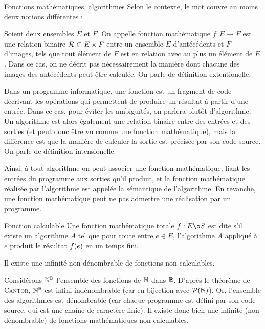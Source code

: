 \documentclass[a4paper,french,bookmarks]{book}
\begin{document}
    \begin{definition}{Fonctions mathématiques, algorithmes}{}
        Selon le contexte, le mot  couvre au moins deux notions différentes :
        \begin{enumerate}
            \itt Soient deux ensembles $E$ et $F$. On appelle fonction mathématique $f: E \to F$  est une relation binaire $\mathcal{R} \subset E\times F$ entre un ensemble $E$ d'antécédents et $F$ d'images, tels que tout élément de $F$ est en relation avec au plus un élément de $E$. Dans ce cas, on ne décrit pas nécessairement la manière dont chacune des images des antécédents peut être calculée. On parle de définition extentionelle.
            
            \itt Dans un programme informatique, une fonction est un fragment de code décrivant les opérations qui permettent de produire un résultat à partir d'une entrée. Dans ce cas, pour éviter les ambiguïtés, on parlera plutôt d'algorithme. Un algorithme est alors également une relation binaire entre des entrées et des sorties (et peut donc être vu comme une fonction mathématique), mais la différence est que la manière de calculer la sortie est précisée par son code source. On parle de définition intensionelle.
        \end{enumerate}
    \end{definition}
    
    Ainsi, à tout algorithme on peut associer une fonction mathématique, liant les entrées du programme aux sorties qu'il produit, et la fonction mathématique réalisée par l'algorithme est appelée la sémantique de l'algorithme. En revanche, une fonction mathématique peut ne pas admettre une réalisation par un programme.
    
    \begin{definition}{Fonction calculable}{}
        Une fonction mathématique totale $f: E \o S$ est dite  s'il existe un algorithme $A$ tel que pour toute entre $e \in E$, l'algorithme $A$ appliqué à $e$ produit le résultat $f\!\left(e\right)$ en un temps fini.
    \end{definition}
    
    \begin{theorem}{}{}
        Il existe une infinité non dénombrable de fonctions non calculables.
    \end{theorem}
    
    \begin{nproof}
        Considérons $\mathbb{N}^{\mathbb{B}}$ l'ensemble des fonctions de $\mathbb{N}$ dans $\mathbb{B}$. D'après le théorème de \textsc{Cantor}, $\mathbb{N}^{\mathbb{B}}$ est infini indénombrable (car en bijection avec $\mathcal{P}\!\left(\mathbb{N}\right)$). Or, l'ensemble des algorithmes est dénombrable (car chaque programme est défini par son code source, qui est une chaîne de caractère finie). Il existe donc bien une infinité (non dénombrable) de fonctions mathématiques non calculables.
    \end{nproof}
    
\end{document}

